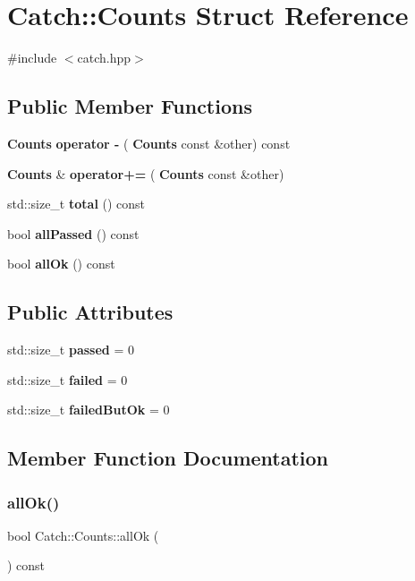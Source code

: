 \section{Catch\+::Counts Struct Reference}
\label{struct_catch_1_1_counts}


{\ttfamily \#include $<$catch.\+hpp$>$}

\subsection*{Public Member Functions}
\begin{DoxyCompactItemize}
\item 
\textbf{ Counts} \textbf{ operator -\/} (\textbf{ Counts} const \&other) const
\item 
\textbf{ Counts} \& \textbf{ operator+=} (\textbf{ Counts} const \&other)
\item 
std\+::size\+\_\+t \textbf{ total} () const
\item 
bool \textbf{ all\+Passed} () const
\item 
bool \textbf{ all\+Ok} () const
\end{DoxyCompactItemize}
\subsection*{Public Attributes}
\begin{DoxyCompactItemize}
\item 
std\+::size\+\_\+t \textbf{ passed} = 0
\item 
std\+::size\+\_\+t \textbf{ failed} = 0
\item 
std\+::size\+\_\+t \textbf{ failed\+But\+Ok} = 0
\end{DoxyCompactItemize}


\subsection{Member Function Documentation}
\mbox{\label{struct_catch_1_1_counts_a33bd996e016030155b99fe1c51c08991}} 
\subsubsection{allOk()}
{\footnotesize\ttfamily bool Catch\+::\+Counts\+::all\+Ok (\begin{DoxyParamCaption}{ }\end{DoxyParamCaption}) const}

